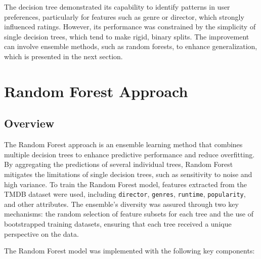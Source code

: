 \documentclass[a3paper,12pt]{article}
\begin{document}
The decision tree demonstrated its capability to identify patterns in user preferences,
particularly for features such as genre or director, which strongly influenced ratings.
However, its performance was constrained by the simplicity of single decision trees, which tend to make rigid,
binary splits.
The improvement can involve ensemble methods, such as random forests, to enhance generalization,
which is presented in the next section.

\section{Random Forest Approach}
\subsection{Overview}
The Random Forest approach is an ensemble learning method that combines multiple decision trees
to enhance predictive performance and reduce overfitting.
By aggregating the predictions of several individual trees, Random Forest mitigates the limitations of
single decision trees, such as sensitivity to noise and high variance.
To train the Random Forest model, features extracted from the TMDB dataset were used, including \texttt{director},
\texttt{genres}, \texttt{runtime}, \texttt{popularity}, and other attributes.
The ensemble's diversity was assured through two key mechanisms: the random selection of feature
subsets for each tree and the use of bootstrapped training datasets, ensuring that each tree received
a unique perspective on the data.

The Random Forest model was implemented with the
following key components:
\end{document}
